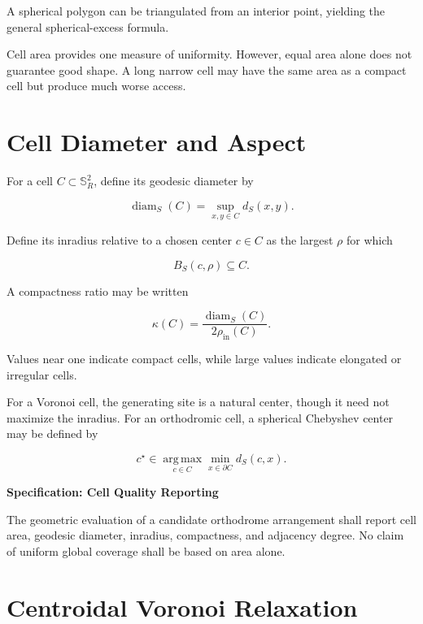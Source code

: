 \documentclass[11pt,fleqn]{book}
\numberwithin{equation}{chapter}
\newenvironment{specification}[1]
  {\begin{specificationEnv}
   \noindent\textbf{Specification: #1}\par\smallskip}
  {\end{specificationEnv}}
\theoremstyle{plain}
\theoremstyle{definition}
\theoremstyle{remark}
\newcommand{\Sphere}{\mathbb{S}^{2}}
\newcommand{\argmax}{\operatorname*{arg\,max}}
\newcommand{\diam}{\operatorname{diam}}
\begin{document}
A spherical polygon can be triangulated from an interior point, yielding the general spherical-excess formula.

Cell area provides one measure of uniformity. However, equal area alone does not guarantee good shape. A long narrow cell may have the same area as a compact cell but produce much worse access.

\section{Cell Diameter and Aspect}

For a cell \(C\subset\Sphere_R\), define its geodesic diameter by

\begin{equation}
    \diam_S(C)
    =
    \sup_{x,y\in C}
    d_S(x,y).
\end{equation}

Define its inradius relative to a chosen center \(c\in C\) as the largest \(\rho\) for which

\begin{equation}
    B_S(c,\rho)\subseteq C.
\end{equation}

A compactness ratio may be written

\begin{equation}
    \kappa(C)
    =
    \frac{
      \diam_S(C)
    }{
      2\rho_{\mathrm{in}}(C)
    }.
\end{equation}

Values near one indicate compact cells, while large values indicate elongated or irregular cells.

For a Voronoi cell, the generating site is a natural center, though it need not maximize the inradius. For an orthodromic cell, a spherical Chebyshev center may be defined by

\begin{equation}
    c^\star
    \in
    \argmax_{c\in C}
    \min_{x\in\partial C}
    d_S(c,x).
\end{equation}

\begin{specification}{Cell Quality Reporting}
The geometric evaluation of a candidate orthodrome arrangement shall report cell area, geodesic diameter, inradius, compactness, and adjacency degree. No claim of uniform global coverage shall be based on area alone.
\end{specification}

\section{Centroidal Voronoi Relaxation}
\end{document}
